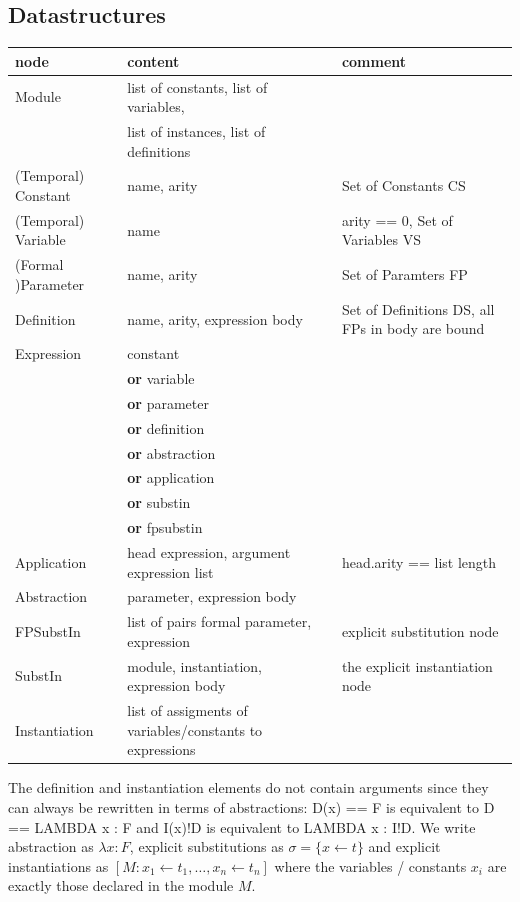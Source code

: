 \documentclass[a4paper]{article}
\newcommand{\dor}{\textbf{or}}
\newcommand{\fpsubstin}[1]{\{#1\}}
\newcommand{\substin}[2]{[#1:#2]}
\newcommand{\fpwith}{\leftarrow}
\newcommand{\iwith}{\leftarrow}
\begin{document}
\subsection{Datastructures}
\label{sec:ds}

\begin{tabular}{lp{}p{}}
  node & content & comment \\
  \hline
  Module & list of constants, list of variables, & \\
       & list of instances, list of definitions & \\
  (Temporal) Constant  & name, arity & Set of Constants CS \\
  (Temporal) Variable  & name & arity == 0, Set of Variables VS \\
  (Formal )Parameter & name, arity & Set of Paramters FP \\
  Definition & name, arity, expression body & Set of Definitions DS,
                                              all FPs in body are bound \\
  Expression  & constant & \\
       & \dor{} variable & \\
       & \dor{} parameter & \\
       & \dor{} definition & \\
       & \dor{} abstraction &\\
       & \dor{} application &\\
       & \dor{} substin & \\
       & \dor{} fpsubstin & \\
  Application & head expression, argument expression list & head.arity == list length\\
  Abstraction & parameter, expression body & \\
  FPSubstIn  & list of pairs formal parameter, expression
                 & explicit substitution node \\
  SubstIn     & module, instantiation, expression body
                 & the explicit instantiation node \\
  Instantiation & list of assigments of variables/constants to expressions& \\
\end{tabular}

The definition and instantiation elements do not contain arguments since they
can always be rewritten in terms of abstractions: D(x) == F is equivalent to
D == LAMBDA x : F and I(x)!D is equivalent to LAMBDA x : I!D. We write
abstraction as $\lambda x : F$, explicit substitutions as
$\sigma = \fpsubstin{x \fpwith t}$ and explicit instantiations as
$\substin{M}{x_1 \iwith t_1,\ldots,x_n \iwith t_n}$ where the variables /
constants $x_i$ are exactly those declared in the module $M$.
\end{document}
